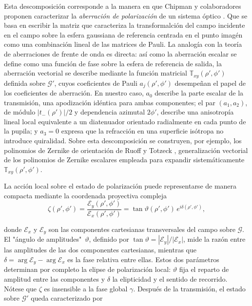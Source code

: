 Esta descomposición corresponde a la manera en que Chipman y colaboradores
proponen caracterizar la \emph{aberración de polarización} de un sistema
óptico \cite{mcguire1994}. Que se basa en escribir la matriz que caracteriza la transformalción del campo incidente en el campo sobre la esfera gaussiana de referencia centrada en el punto imagén como una combinación lineal de las matrices de Pauli. La analogía con la teoría de aberraciones de frente
de onda es directa: así como la aberración escalar se define como una función
de fase sobre la esfera de referencia de salida, la aberración vectorial se describe mediante la función
matricial $\mathbb{T}_{xy}(\rho',\phi')$ definida sobre $\mathscr{G}'$, cuyos
coeficientes de Pauli $a_j(\rho',\phi')$ desempeñan el papel de los
coeficientes de aberración. En nuestro caso, $a_0$ describe la parte escalar
de la transmisión, una apodización idéntica para ambas componentes; el par
$(a_1,a_2)$, de módulo $|t_-(\rho')|/2$ y dependencia azimutal $2\phi'$,
describe una anisotropía lineal local equivalente a un diatenuador orientado
radialmente en cada punto de la pupila; y $a_3=0$ expresa que la refracción en
una superficie isótropa no introduce quiralidad. Sobre esta descomposición se
construyen, por ejemplo, los polinomios de Zernike de orientación de Ruoff y
Totzeck \cite{ruoff2009}, generalización vectorial de los polinomios de
Zernike escalares empleada para expandir sistemáticamente
$\mathbb{T}_{xy}(\rho',\phi')$.

La acción local sobre el estado de polarización puede representarse de manera
compacta mediante la coordenada proyectiva compleja \cite{azzam1977}
\begin{equation}
\zeta(\rho',\phi')
=
\frac{\mathscr E_y(\rho',\phi')}{\mathscr E_x(\rho',\phi')}
=
\tan \vartheta(\rho',\phi')\, e^{i\delta(\rho',\phi')},
\label{eq:zeta_def}
\end{equation}


donde $\mathscr E_x$ y $\mathscr E_y$ son las componentes cartesianas
transversales del campo sobre $\mathscr{G}$. El "ángulo de amplitudes" 
$\, \vartheta$, definido por $\tan\vartheta=|\mathscr E_y|/|\mathscr E_x|$, mide
la razón entre las amplitudes de las dos componentes cartesianas, mientras que
$\delta=\arg\mathscr E_y-\arg\mathscr E_x$ es la fase relativa entre ellas.
Estos dos parámetros determinan por completo la elipse de polarización local:
$\vartheta$ fija el reparto de amplitud entre las componentes y $\delta$ la
elipticidad y el sentido de recorrido. Nótese que $\zeta$ es insensible
a la fase global $\gamma$. Después de la transmisión, el estado sobre $\mathscr{G}'$ queda caracterizado por


